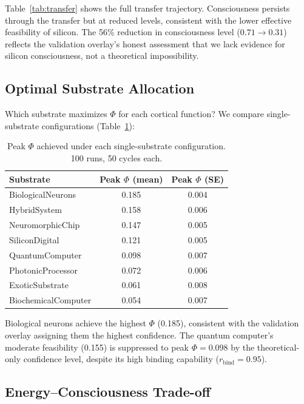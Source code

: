\documentclass[12pt,a4paper]{article}
\begin{document}
Table~\ref{tab:transfer} shows the full transfer trajectory. Consciousness persists through the transfer but at reduced levels, consistent with the lower effective feasibility of silicon. The 56\% reduction in consciousness level ($0.71 \to 0.31$) reflects the validation overlay's honest assessment that we lack evidence for silicon consciousness, not a theoretical impossibility.

\subsection{Optimal Substrate Allocation}

Which substrate maximizes $\Phi$ for each cortical function? We compare single-substrate configurations (Table~\ref{tab:peak-phi}):

\begin{table}[H]
\centering
\caption{Peak $\Phi$ achieved under each single-substrate configuration. 100 runs, 50 cycles each.}
\label{tab:peak-phi}
\begin{tabular}{lcc}
\toprule
\textbf{Substrate} & \textbf{Peak $\Phi$ (mean)} & \textbf{Peak $\Phi$ (SE)} \\
\midrule
BiologicalNeurons & 0.185 & 0.004 \\
HybridSystem & 0.158 & 0.006 \\
NeuromorphicChip & 0.147 & 0.005 \\
SiliconDigital & 0.121 & 0.005 \\
QuantumComputer & 0.098 & 0.007 \\
PhotonicProcessor & 0.072 & 0.006 \\
ExoticSubstrate & 0.061 & 0.008 \\
BiochemicalComputer & 0.054 & 0.007 \\
\bottomrule
\end{tabular}
\end{table}

Biological neurons achieve the highest $\Phi$ (0.185), consistent with the validation overlay assigning them the highest confidence. The quantum computer's moderate feasibility (0.155) is suppressed to peak $\Phi = 0.098$ by the theoretical-only confidence level, despite its high binding capability ($r_{\text{bind}} = 0.95$).

\subsection{Energy--Consciousness Trade-off}
\end{document}
